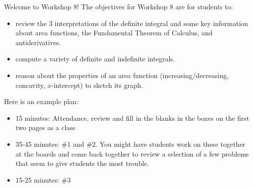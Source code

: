 \documentclass{article}
\begin{document}
\begin{workshop}
    Welcome to Workshop 8! 
    \newline 
    The objectives for Workshop 8 are for students to:
    \begin{itemize}
        \item review the 3 interpretations of the definite integral and some key information about area functions, the Fundamental Theorem of Calculus, and antiderivatives.
        \item compute a variety of definite and indefinite integrals.
        \item reason about the properties of an area function (increasing/decreasing, concavity, $x$-intercept) to sketch its graph.
    \end{itemize}
    Here is an example plan: 
    \begin{itemize}
        \item 15 minutes: Attendance, review and fill in the blanks in the boxes on the first two pages as a class
        \item 35-45 minutes: \#1 and \#2. You might have students work on these together at the boards and come back together to review a selection of a few problems that seem to give students the most trouble.
        \item 15-25 minutes: \#3
    \end{itemize}
\end{workshop}
\end{document}
